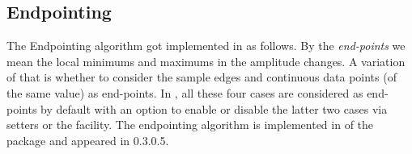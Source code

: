 




\subsection{Endpointing}

The Endpointing algorithm got implemented in {\marf} as follows.
By the {\em end-points} we mean the local minimums and maximums
in the amplitude changes. A variation of that is whether to
consider the sample edges and continuous data points (of the same
value) as end-points. In {\marf}, all these four cases
are considered as end-points by default with an option to
enable or disable the latter two cases via setters or the 
facility. The endpointing algorithm is implemented in 
of the  package and appeared in 0.3.0.5.















